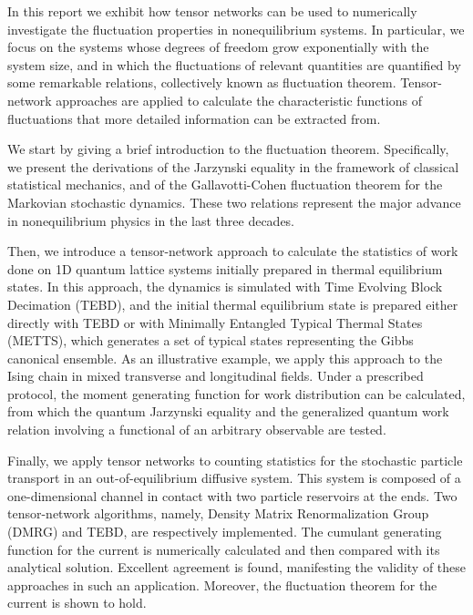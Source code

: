 \begin{spacing}{1.5} %
\par In this report we exhibit how tensor networks can be used to numerically investigate the fluctuation properties in nonequilibrium systems. In particular, we focus on the systems whose degrees of freedom grow exponentially with the system size, and in which the fluctuations of relevant quantities are quantified by some remarkable relations, collectively known as fluctuation theorem. Tensor-network approaches are applied to calculate the characteristic functions of fluctuations that more detailed information can be extracted from.

\par We start by giving a brief introduction to the fluctuation theorem. Specifically, we present the derivations of the Jarzynski equality in the framework of classical statistical mechanics, and of the Gallavotti-Cohen fluctuation theorem for the Markovian stochastic dynamics. These two relations represent the major advance in nonequilibrium physics in the last three decades.

\par Then, we introduce a tensor-network approach to calculate the statistics of work done on 1D quantum lattice systems initially prepared in thermal equilibrium states. In this approach, the dynamics is simulated with Time Evolving Block Decimation (TEBD), and the initial thermal equilibrium state is prepared either directly with TEBD or with Minimally Entangled Typical Thermal States (METTS), which generates a set of typical states representing the Gibbs canonical ensemble. As an illustrative example, we apply this approach to the Ising chain in mixed transverse and longitudinal fields. Under a prescribed protocol, the moment generating function for work distribution can be calculated, from which the quantum Jarzynski equality and the generalized quantum work relation involving a functional of an arbitrary observable are tested.

\par Finally, we apply tensor networks to counting statistics for the stochastic particle transport in an out-of-equilibrium diffusive system. This system is composed of a one-dimensional channel in contact with two particle reservoirs at the ends. Two tensor-network algorithms, namely, Density Matrix Renormalization Group (DMRG) and TEBD, are respectively implemented. The cumulant generating function for the current is numerically calculated and then compared with its analytical solution. Excellent agreement is found, manifesting the validity of these approaches in such an application. Moreover, the fluctuation theorem for the current is shown to hold.
\end{spacing}
\vspace{5mm}

